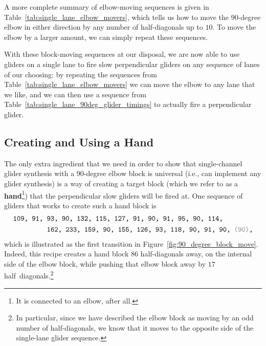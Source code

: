 A more complete summary of elbow-moving sequences is given in Table~\ref{tab:single_lane_elbow_movers}, which tells us how to move the $90$-degree elbow in either direction by any number of half-diagonals up to $10$. To move the elbow by a larger amount, we can simply repeat these sequences.

With these block-moving sequences at our disposal, we are now able to use gliders on a single lane to fire slow perpendicular gliders on any sequence of lanes of our choosing: by repeating the sequences from Table~\ref{tab:single_lane_elbow_movers} we can move the elbow to any lane that we like, and we can then use a sequence from Table~\ref{tab:single_lane_90deg_glider_timings} to  actually fire a perpendicular glider.


\subsection{Creating and Using a Hand}\label{sec:single_channel_hand}

The only extra ingredient that we need in order to show that single-channel glider synthesis with a 90-degree elbow block is universal (i.e., can implement any glider synthesis) is a way of creating a target block (which we refer to as a \textbf{hand}\footnote{It is connected to an elbow, after all.}) that the perpendicular slow gliders will be fired at. One sequence of gliders that works to create such a hand block is
\begin{align}\begin{split}\label{eq:make_hand_90_deg}
& \text{\texttt{109, 91, 93, 90, 132, 115, 127, 91, 90, 91, 95, 90, 114,}} \\
& \text{\texttt{~~~~~~~~~162, 233, 159, 90, 155, 126, 93, 118, 90, 91, 90, {\color{gray}(90)},}}
\end{split}\end{align}
which is illustrated as the first transition in Figure~\ref{fig:90_degree_block_move}. Indeed, this recipe creates a hand block $86$ half-diagonals away, on the internal side of the elbow block, while pushing that elbow block away by $17$ half~diagonals.\footnote{In particular, since we have described the elbow block as moving by an odd number of half-diagonals, we know that it moves to the opposite side of the single-lane glider sequence.}


